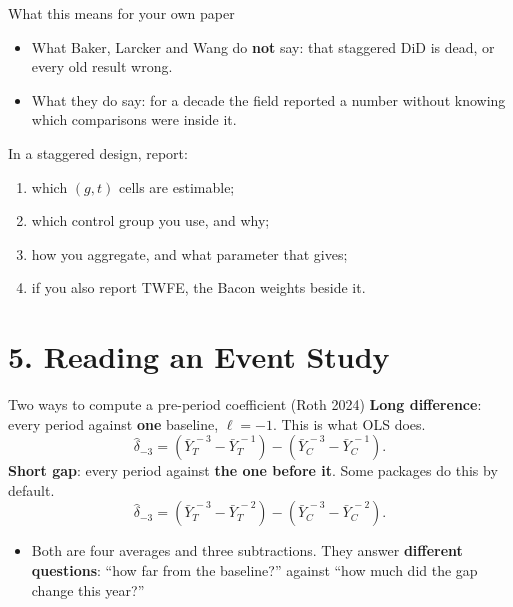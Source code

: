 \documentclass[
  11pt,
  ignorenonframetext,
  aspectratio=169,
]{beamer}
\providecommand{\tightlist}{%
  \setlength{\itemsep}{0pt}\setlength{\parskip}{0pt}}
\begin{document}
\begin{frame}{What this means for your own paper}
\protect{}\label{what-this-means-for-your-own-paper}
\begin{itemize}
\tightlist
\item
  What Baker, Larcker and Wang do \textbf{not} say: that staggered DiD
  is dead, or every old result wrong.
\item
  What they do say: for a decade the field reported a number without
  knowing which comparisons were inside it.
\end{itemize}

\vspace{0.4em}

In a staggered design, report:

\begin{enumerate}
\tightlist
\item
  which \((g, t)\) cells are estimable;
\item
  which control group you use, and why;
\item
  how you aggregate, and what parameter that gives;
\item
  if you also report TWFE, the Bacon weights beside it.
\end{enumerate}
\end{frame}

\section{5. Reading an Event Study}\label{reading-an-event-study}

\begin{frame}{Two ways to compute a pre-period coefficient (Roth 2024)}
\protect{}\label{two-ways-to-compute-a-pre-period-coefficient-roth-2024}
\textbf{Long difference}: every period against \textbf{one} baseline,
\(\ell = -1\). This is what OLS does. \[
\hat\delta_{-3} = (\bar Y_T^{\,-3} - \bar Y_T^{\,-1}) - (\bar Y_C^{\,-3} - \bar Y_C^{\,-1}).
\] \textbf{Short gap}: every period against \textbf{the one before it}.
Some packages do this by default. \[
\hat\delta_{-3} = (\bar Y_T^{\,-3} - \bar Y_T^{\,-2}) - (\bar Y_C^{\,-3} - \bar Y_C^{\,-2}).
\]

\begin{itemize}
\tightlist
\item
  Both are four averages and three subtractions. They answer
  \textbf{different questions}: ``how far from the baseline?'' against
  ``how much did the gap change this year?''
\end{itemize}
\end{frame}
\end{document}
